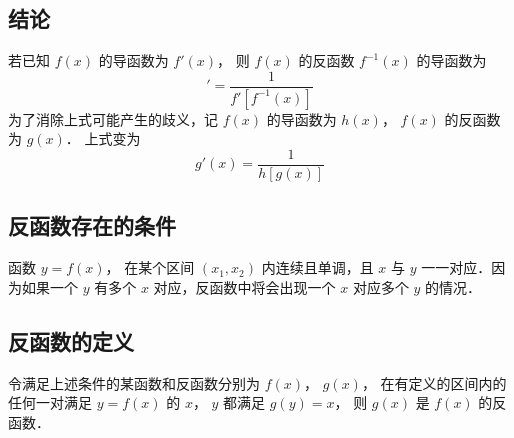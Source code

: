 

\subsection{结论}
若已知 $f(x)$ 的导函数为 $f'(x)$， 则 $f(x)$ 的反函数 $f^{-1}(x)$ 的导函数为
\begin{equation}
[f^{-1}(x)]' = \frac{1}{f'[f^{-1}(x)]} 
\end{equation} 
为了消除上式可能产生的歧义，记 $f(x)$ 的导函数为 $h(x)$，  $f(x)$ 的反函数为 $g(x)$． 上式变为
 \begin{equation}
g'(x) = \frac{1}{h[g(x)]}
\end{equation}
\subsection{反函数存在的条件}
函数 $y = f(x)$， 在某个区间 $(x_1, x_2)$ 内连续且单调，且 $x$ 与 $y$ 一一对应．因为如果一个 $y$ 有多个 $x$ 对应，反函数中将会出现一个 $x$ 对应多个 $y$ 的情况．
\subsection{反函数的定义}
令满足上述条件的某函数和反函数分别为 $f(x)$，  $g(x)$， 在有定义的区间内的任何一对满足 $y = f(x)$ 的 $x$，  $y$ 都满足 $g(y) = x$， 则 $g(x)$ 是 $f(x)$ 的反函数．

